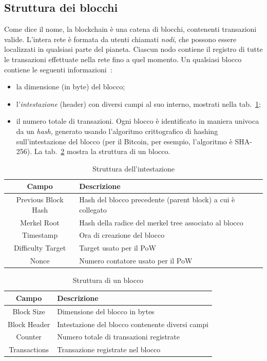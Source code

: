 \subsection{Struttura dei blocchi}
Come dice il nome, la blockchain \`e una catena di blocchi, contenenti transazioni valide. L'intera rete \`e formata da utenti chiamati \textit{nodi}, che possono essere localizzati in qualsiasi parte del pianeta. Ciascun nodo contiene il registro di tutte le transazioni effettuate nella rete fino a quel momento.
Un qualsiasi blocco contiene le seguenti informazioni~\cite{art:bc2}:
\begin{itemize} 
\item la dimensione (in byte) del blocco;
\item l'\textit{intestazione} (header) con diversi campi al suo interno, mostrati nella tab.~\ref{tab:intestazione};
\item il numero totale di transazioni. 
Ogni blocco \`e identificato in maniera univoca da un \textit{hash}, generato usando l’algoritmo crittografico di hashing sull’intestazione del blocco (per il Bitcoin, per esempio, l'algoritmo \`e SHA-256). La tab.~\ref{tab:blocco} mostra la struttura di un blocco.
\end{itemize}
\begin{table}
\centering
\begin{tabular}[t]{|c|l|}
\hline
\textbf{Campo} & \textbf{Descrizione} \\
\hline
Previous Block Hash & Hash del blocco precedente (parent block) a cui \`e collegato\\
\hline
Merkel Root & Hash della radice del merkel tree associato al blocco \\
\hline
Timestamp & Ora di creazione del blocco \\
\hline
Difficulty Target & Target usato per il PoW \\
\hline
Nonce & Numero contatore usato per il PoW \\
\hline
\end{tabular}
\caption{Struttura dell'intestazione}
\label{tab:intestazione}
\end{table}
\begin{table}
\centering
\begin{tabular}[t]{|c|l|}
\hline
\textbf{Campo} & \textbf{Descrizione} \\
\hline
Block Size & Dimensione del blocco in bytes \\
\hline
Block Header & Intestazione del blocco contenente diversi campi \\
\hline
Counter & Numero totale di transazioni registrate \\
\hline
Transactions & Transazione registrate nel blocco \\
\hline
\end{tabular}
\caption{Struttura di un blocco}
\label{tab:blocco}
\end{table}
